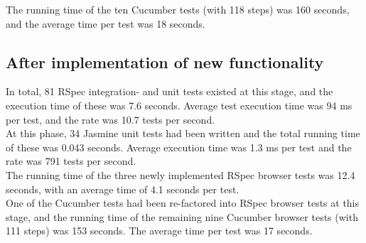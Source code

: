 The running time of the ten Cucumber tests (with 118 steps) was 160
seconds, and the average time per test was 18 seconds.\\


\subsection{After implementation of new functionality}

In total, 81 RSpec integration- and unit tests existed at this stage,
and the execution time of these was 7.6 seconds. Average test execution
time was 94 ms per test, and the rate was 10.7 tests per
second.\\

At this phase, 34 Jasmine unit tests had been written and the total
running time of these was 0.043 seconds. Average execution time was 1.3
ms per test and the rate was 791 tests per second.\\

The running time of the three newly implemented RSpec browser tests was
12.4 seconds, with an average time of 4.1 seconds per test.\\

One of the Cucumber tests had been re-factored into RSpec browser tests
at this stage, and the running time of the remaining nine Cucumber
browser tests (with 111 steps) was 153 seconds. The average time per
test was 17 seconds.\\
